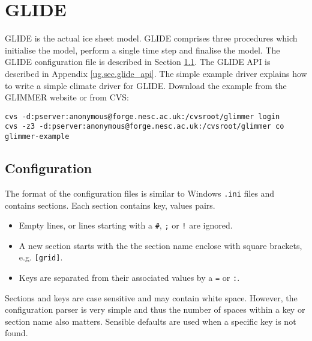 \section{GLIDE}
GLIDE is the actual ice sheet model. GLIDE comprises three procedures which initialise the model, perform a single time step and finalise the model. The GLIDE configuration file is described in Section \ref{ug.sec.config}. The GLIDE API is described in Appendix \ref{ug.sec.glide_api}. The simple example driver explains how to write a simple climate driver for GLIDE. Download the example from the GLIMMER website or from CVS:
\begin{verbatim}
cvs -d:pserver:anonymous@forge.nesc.ac.uk:/cvsroot/glimmer login
cvs -z3 -d:pserver:anonymous@forge.nesc.ac.uk:/cvsroot/glimmer co glimmer-example
\end{verbatim}

\subsection{Configuration}\label{ug.sec.config}
The format of the configuration files is similar to Windows \texttt{.ini} files and contains sections. Each section contains key, values pairs.
\begin{itemize}
\item Empty lines, or lines starting with a \texttt{\#}, \texttt{;} or \texttt{!} are ignored.
\item A new section starts with the the section name enclose with square brackets, e.g. \texttt{[grid]}.
\item Keys are separated from their associated values by a \texttt{=} or \texttt{:}.
\end{itemize}
Sections and keys are case sensitive and may contain white space. However, the configuration parser is very simple and thus the number of spaces within a key or section name also matters. Sensible defaults are used when a specific key is not found.

